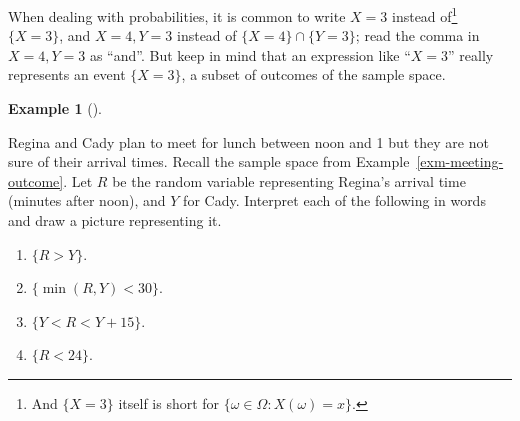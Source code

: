 \documentclass[
  letterpaper,
  DIV=11,
  numbers=noendperiod]{scrreprt}
\providecommand{\tightlist}{%
  \setlength{\itemsep}{0pt}\setlength{\parskip}{0pt}}
\theoremstyle{plain}
\theoremstyle{definition}
\newtheorem{example}{Example}[chapter]
\theoremstyle{definition}
\theoremstyle{definition}
\theoremstyle{remark}
\begin{document}
When dealing with probabilities, it is common to write \(X=3\) instead
of\footnote{And \(\{X = 3\}\) itself is short for
  \(\{\omega\in\Omega:X(\omega) = x\}\).} \(\{X=3\}\), and
\(X = 4, Y = 3\) instead of \(\{X = 4\}\cap \{Y = 3\}\); read the comma
in \(X = 4, Y = 3\) as ``and''. But keep in mind that an expression like
``\(X=3\)'' really represents an event \(\{X=3\}\), a subset of outcomes
of the sample space.

\begin{tcolorbox}[enhanced jigsaw, opacityback=0, left=2mm, colframe=quarto-callout-note-color-frame, toprule=.15mm, breakable, colback=white, leftrule=.75mm, arc=.35mm, rightrule=.15mm, bottomrule=.15mm]

\begin{example}[]\protect\hypertarget{exm-meeting-rv-event}{}\label{exm-meeting-rv-event}

Regina and Cady plan to meet for lunch between noon and 1 but they are
not sure of their arrival times. Recall the sample space from
Example~\ref{exm-meeting-outcome}. Let \(R\) be the random variable
representing Regina's arrival time (minutes after noon), and \(Y\) for
Cady. Interpret each of the following in words and draw a picture
representing it.

\begin{enumerate}
\def\labelenumi{\arabic{enumi}.}
\tightlist
\item
  \(\{R > Y\}\).
\item
  \(\{\min(R, Y) < 30\}\).
\item
  \(\{Y<R<Y+15\}\).
\item
  \(\{R < 24\}\).
\end{enumerate}

\end{example}

\end{tcolorbox}
\end{document}
